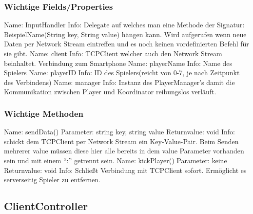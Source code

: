 \subsubsection{Wichtige Fields/Properties}
Name: InputHandler
\newline 
Info: Delegate auf welches man eine Methode der Signatur:
BeispielName(String key, String value) hängen kann. Wird aufgerufen wenn neue Daten per Network Stream eintreffen und es noch keinen vordefinierten Befehl für sie gibt.
\newline \newline
Name: client
\newline 
Info: TCPClient welcher auch den Network Stream beinhaltet. Verbindung zum Smartphone
\newline \newline
Name: playerName
\newline 
Info: Name des Spielers
\newline \newline
Name: playerID
\newline 
Info: ID des Spielers(reicht von 0-7, je nach Zeitpunkt des Verbindens)
\newline \newline
Name: manager
\newline
Info: Instanz des PlayerManager’s damit die Kommunikation zwischen Player und Koordinator reibungslos verläuft.
\newline \newline
\subsubsection{Wichtige Methoden}
Name: sendData()
\newline
Parameter: string key, string value
\newline
Returnvalue: void
\newline
Info: schickt dem TCPClient per Network Stream ein Key-Value-Pair. Beim Senden mehrerer value müssen diese hier alle bereits in dem value Parameter vorhanden sein und mit einem “:” getrennt sein.
\newline \newline
Name: kickPlayer()
\newline
Parameter: keine
\newline
Returnvalue: void
\newline
Info: Schließt Verbindung mit TCPClient sofort. Ermöglicht es serverseitig Spieler zu entfernen.
\newline
\subsection{ClientController}
